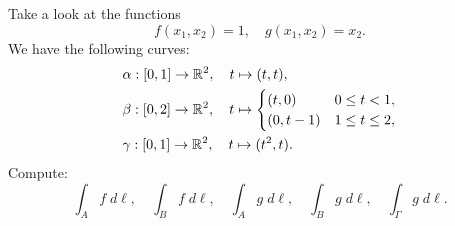\documentclass[11pt]{article}
\begin{document}
\begin{exercise}
    Take a look at the functions 
    \[
        f(x_1,x_2) = 1, \quad g(x_1,x_2) = x_2.
    \]
    We have the following curves:
    \begin{align*}
        &\alpha : [0,1] \to \mathbb{R}^2, \quad t \mapsto (t,t),
        \\
        &\beta  : [0,2] \to \mathbb{R}^2, \quad t \mapsto \begin{cases} (t,0) & 0 \leq t < 1, \\ (0,t-1) & 1 \leq t \leq 2, \end{cases}
        \\
        &\gamma : [0,1] \to \mathbb{R}^2, \quad t \mapsto (t^2,t).
    \end{align*}
    Compute:
    \[
        \int_A f \;d\ell, \quad \int_B f \;d\ell, \quad 
        \int_A g \;d\ell, \quad \int_B g \;d\ell, \quad 
        \int_\Gamma g \;d\ell
        .
    \]
\end{exercise}
\end{document}
